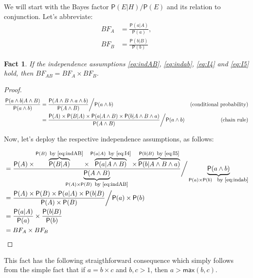 \documentclass[
  10pt,
  dvipsnames,enabledeprecatedfontcommands]{scrartcl}
\newtheorem{fact}{Fact}
\newcommand{\et}{\wedge}
\newcommand{\pr}[1]{\ensuremath{\mathsf{P}(#1)}}
\begin{document}
We will start with the Bayes factor \(\pr{E \vert H}/\pr{E}\) and its
relation to conjunction. Let's abbreviate: \begin{align*}
BF_A  & =  \frac{\pr{a \vert A}}{\pr{a}},\\
BF_B & = \frac{\pr{b \vert B}}{\pr{b}}
\end{align*}

\begin{fact} If the independence assumptions \eqref{eq:indAB}, \eqref{eq:indab}, \eqref{eq:I4} and \eqref{eq:I5} hold, then 
$BF_{AB} = BF_A \times BF_B$. \label{fac:BFindep}
\end{fact}

\begin{proof}

\begin{align*}
\frac{\pr{a \wedge b\vert A\wedge B}}{\pr{a \wedge b}} & = \frac{\pr{A \et B\et a\wedge b}}{\pr{A \et B}} \bigg/ \pr{a \wedge b}
&\mbox{(conditional probability)} \\
&  = \frac{\pr{A} \times \pr {B \vert A}  \times \pr{a \vert A \et B} \times \pr{b \vert A \et B \et a}}{\pr{A \et B}} \bigg/ \pr{a \wedge b}
&\mbox{\,\,\,\,\,\,\, (chain rule)} \\
\end{align*}

\noindent Now, let's deploy the respective independence assumptions, as follows:

\begin{align*}
&  = \frac{\pr{A} \times \overbrace{\pr {B \vert A}}^{ \pr{B} \mbox{\footnotesize \, by \eqref{eq:indAB}}}  \times
\overbrace{\pr{a \vert A \et B}}^{\pr{a \vert A} \mbox{\footnotesize \, by \eqref{eq:I4}}}
\times \overbrace{\pr{b \vert A \et B \et a}}^{\pr{b \vert B} \mbox{\footnotesize \, by \eqref{eq:I5}}}
}{\underbrace{\pr{A \et B}}_{\pr{A} \times \pr{B} \mbox{\footnotesize \, by \eqref{eq:indAB}}}} \bigg/ \underbrace{\pr{a \wedge b}}_{\pr{a}\times \pr{b} \mbox{ \footnotesize \, by \eqref{eq:indab}}} \\
&  = \frac{\pr{A} \times  \pr{B}   \times \pr{a \vert A}  \times  \pr{b \vert B}}
{\pr{A} \times \pr{B}} \bigg/ \pr{a}\times \pr{b} \\
& = \frac{\pr{a \vert A}  }{\pr{a}}  \times \frac{\pr{b \vert B}}{\pr{b}} \\
& = BF_{A} \times BF_B
\end{align*}

\end{proof}

This fact has the following straigthforward consequence which simply
follows from the simple fact that if \(a = b \times c\) and \(b, c>1\),
then \(a > \mathsf{max}(b,c)\).
\end{document}
